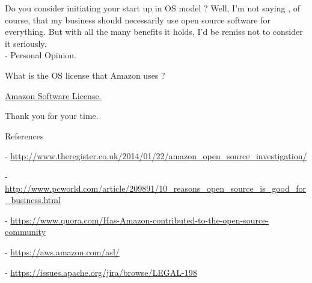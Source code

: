 \documentclass{beamer}
\begin{document}
\begin{frame}{Do you consider initiating your start up in OS model ?}
	\centering 
	Well,  I’m not saying , of course, that my business should necessarily use open source software for everything. 
	But with all the many benefits it holds, I'd be remiss not to consider it seriously.
	\\ - Personal Opinion.
\end{frame}

\begin{frame}{What is the OS license that Amazon uses ?}
	
	\centering \huge \href{https://aws.amazon.com/asl/}{Amazon Software License.}
\end{frame}


\begin{frame}
\centering \huge {Thank you for your time.}
\end{frame}

\begin{frame}{References}
	
	- \url{http://www.theregister.co.uk/2014/01/22/amazon_open_source_investigation/}
	
	- \url{http://www.pcworld.com/article/209891/10_reasons_open_source_is_good_for_business.html}
	
	- \url{https://www.quora.com/Has-Amazon-contributed-to-the-open-source-community}
	
	- \url{https://aws.amazon.com/asl/}
	
	- \url{https://issues.apache.org/jira/browse/LEGAL-198}
	
\end{frame}
\end{document}
